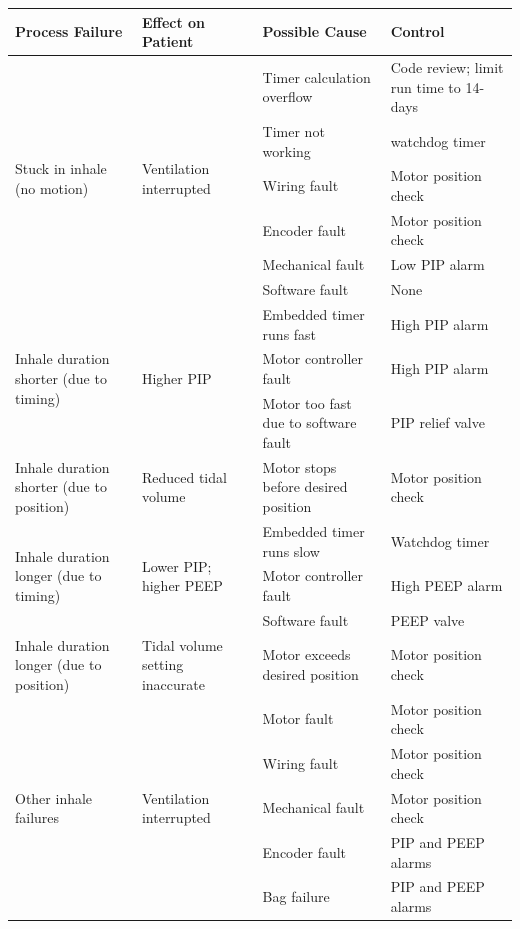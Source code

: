 \documentclass[]{article}
\begin{document}
\begin{center}
\begin{table}[h]
\begin{tabular}{ |p{3.5cm}|p{3cm}| p{3.5cm}| p{3.5cm}|}
			
			\hline
			\textbf{Process Failure}& \textbf{Effect on Patient} &\textbf{Possible Cause} & \textbf{Control}  \\ \hline
			\multirow{6}{3.5cm}{Stuck in inhale (no motion)} & \multirow{6}{3cm}{Ventilation interrupted} & Timer calculation overflow & Code review; limit run time to 14-days \\ \cline{3-4}
			& & Timer not working & watchdog timer\\ \cline{3-4}
			& & Wiring fault & Motor position check\\ \cline{3-4}
			& & Encoder fault & Motor position check\\ \cline{3-4}
			& & Mechanical fault & Low PIP alarm\\ \cline{3-4}
			& & Software fault & None\\ \hline
			\multirow{3}{3.5cm}{Inhale duration shorter (due to timing)} & \multirow{3}{3cm}{Higher PIP} & Embedded timer runs fast & High PIP alarm\\ \cline{3-4}
			& & Motor controller fault & High PIP alarm\\ \cline{3-4}
			& & Motor too fast due to software fault & PIP relief valve\\ \hline
			Inhale duration shorter (due to position) & Reduced tidal volume & Motor stops before desired position & Motor position check\\ \hline
			\multirow{3}{3.5cm}{Inhale duration longer (due to timing)} & \multirow{3}{3cm}{Lower PIP; higher PEEP} & Embedded timer runs slow & Watchdog timer\\ \cline{3-4}
			& & Motor controller fault & High PEEP alarm\\ \cline{3-4}
			& & Software fault & PEEP valve\\ \hline
			Inhale duration longer (due to position) & Tidal volume setting inaccurate & Motor exceeds desired position & Motor position check\\ \hline
			\multirow{5}{3.5cm}{Other inhale failures} & \multirow{5}{3cm}{Ventilation interrupted} & Motor fault & Motor position check\\ \cline{3-4}
			& & Wiring fault & Motor position check\\ \cline{3-4}
			& & Mechanical fault & Motor position check\\ \cline{3-4}
			& & Encoder fault & PIP and PEEP alarms\\ \cline{3-4}
			& & Bag failure & PIP and PEEP alarms\\ \hline
			
		\end{tabular}
	\end{table}	
\end{center}
\end{document}
